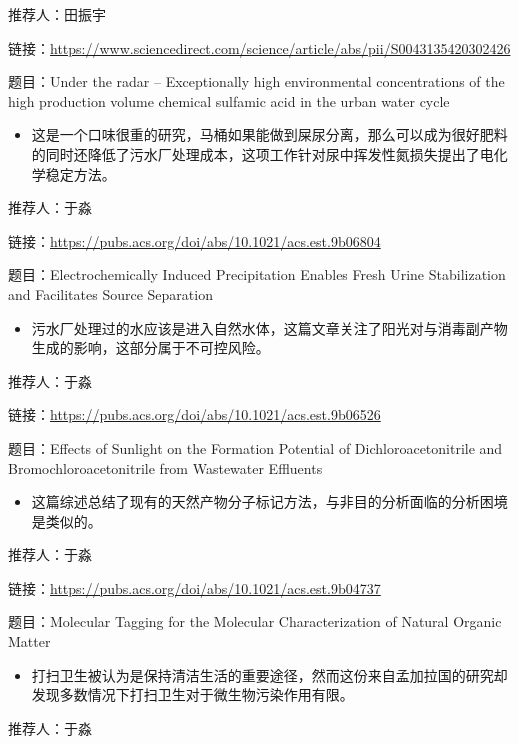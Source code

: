 \documentclass[]{book}
\providecommand{\tightlist}{%
  \setlength{\itemsep}{0pt}\setlength{\parskip}{0pt}}
\begin{document}
推荐人：田振宇

链接：\url{https://www.sciencedirect.com/science/article/abs/pii/S0043135420302426}

题目：Under the radar -- Exceptionally high environmental concentrations of the high production volume chemical sulfamic acid in the urban water cycle

\begin{itemize}
\tightlist
\item
  这是一个口味很重的研究，马桶如果能做到屎尿分离，那么可以成为很好肥料的同时还降低了污水厂处理成本，这项工作针对尿中挥发性氮损失提出了电化学稳定方法。
\end{itemize}

推荐人：于淼

链接：\url{https://pubs.acs.org/doi/abs/10.1021/acs.est.9b06804}

题目：Electrochemically Induced Precipitation Enables Fresh Urine Stabilization and Facilitates Source Separation

\begin{itemize}
\tightlist
\item
  污水厂处理过的水应该是进入自然水体，这篇文章关注了阳光对与消毒副产物生成的影响，这部分属于不可控风险。
\end{itemize}

推荐人：于淼

链接：\url{https://pubs.acs.org/doi/abs/10.1021/acs.est.9b06526}

题目：Effects of Sunlight on the Formation Potential of Dichloroacetonitrile and Bromochloroacetonitrile from Wastewater Effluents

\begin{itemize}
\tightlist
\item
  这篇综述总结了现有的天然产物分子标记方法，与非目的分析面临的分析困境是类似的。
\end{itemize}

推荐人：于淼

链接：\url{https://pubs.acs.org/doi/abs/10.1021/acs.est.9b04737}

题目：Molecular Tagging for the Molecular Characterization of Natural Organic Matter

\begin{itemize}
\tightlist
\item
  打扫卫生被认为是保持清洁生活的重要途径，然而这份来自孟加拉国的研究却发现多数情况下打扫卫生对于微生物污染作用有限。
\end{itemize}

推荐人：于淼
\end{document}
